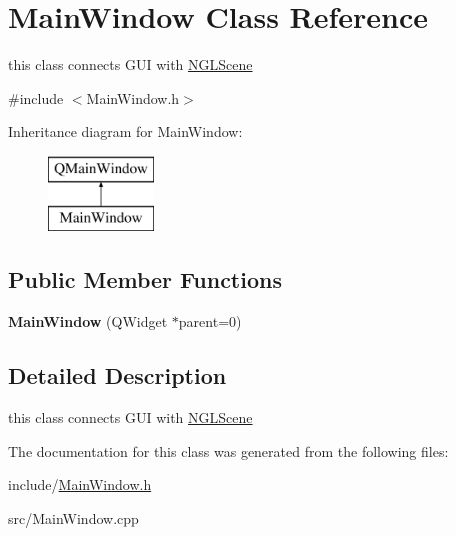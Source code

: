 \hypertarget{classMainWindow}{\section{Main\-Window Class Reference}
\label{classMainWindow}
}


this class connects G\-U\-I with \hyperlink{classNGLScene}{N\-G\-L\-Scene}  




{\ttfamily \#include $<$Main\-Window.\-h$>$}

Inheritance diagram for Main\-Window\-:\begin{figure}[H]
\begin{center}
\leavevmode
\includegraphics[height=2.000000cm]{classMainWindow}
\end{center}
\end{figure}
\subsection*{Public Member Functions}
\begin{DoxyCompactItemize}
\item 
\hypertarget{classMainWindow_a8b244be8b7b7db1b08de2a2acb9409db}{{\bfseries Main\-Window} (Q\-Widget $\ast$parent=0)}\label{classMainWindow_a8b244be8b7b7db1b08de2a2acb9409db}

\end{DoxyCompactItemize}


\subsection{Detailed Description}
this class connects G\-U\-I with \hyperlink{classNGLScene}{N\-G\-L\-Scene} 

The documentation for this class was generated from the following files\-:\begin{DoxyCompactItemize}
\item 
include/\hyperlink{MainWindow_8h}{Main\-Window.\-h}\item 
src/Main\-Window.\-cpp\end{DoxyCompactItemize}
